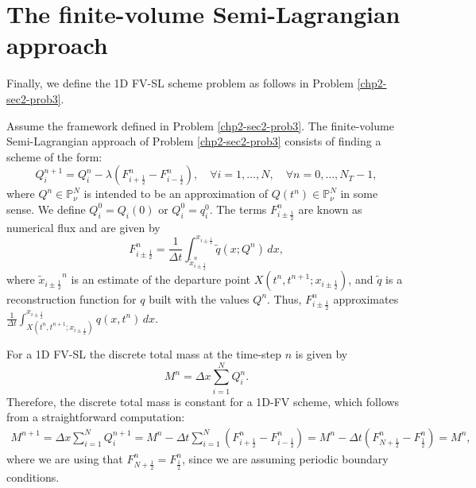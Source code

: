 \section{The finite-volume Semi-Lagrangian approach}
\label{chp2-sec2-fvsl}
Finally, we define the 1D FV-SL scheme problem as follows in Problem \ref{chp2-sec2-prob3}.
\begin{prob}[1D FV-SL scheme]
	\label{chp2-sec2-prob4}
	Assume the framework defined in Problem \ref{chp2-sec2-prob3}.
	The finite-volume Semi-Lagrangian approach of Problem \ref{chp2-sec2-prob3}
	consists of finding a scheme of the form:
	\begin{equation}
		\label{1d-fv-scheme}
		{Q}_{i}^{n+1} = {Q}_{i}^{n} -
		\lambda({F}_{i+\frac{1}{2}}^{n} - {F}_{i-\frac{1}{2}}^{n}),
		\quad \forall i = 1, \ldots, N,
		\quad \forall n = 0, \ldots, N_T-1,
	\end{equation}
	where ${Q}^{n} \in \mathbb{P}^{N}_{\nu}$ is intended to be an approximation
	of ${Q}(t^{n})\in \mathbb{P}^{N}_{\nu}$ in some sense. We define
	${Q}_{i}^{0} = {Q}_i(0)$ or ${Q}_{i}^{0} = {q}^{0}_{i}$.
	The terms ${F}_{i\pm\frac{1}{2}}^{n}$ are known as numerical flux and are given by
	\begin{equation}
		{F}_{i\pm\frac{1}{2}}^{n} =
		\frac{1}{\Delta t}
		\int_{\tilde{x}_{i\pm\frac{1}{2}}^n}^{x_{i\pm\frac{1}{2}}}\tilde{q}(x; Q^n) \,dx,
	\end{equation}
	where ${\tilde{x}_{i\pm\frac{1}{2}}}^n$ is an estimate of the departure point $X(t^n,t^{n+1};x_{i\pm \frac{1}{2}})$,
	and $\tilde{q}$ is a reconstruction function for $q$ built with the values $Q^n$.
	Thus, ${F}_{i\pm\frac{1}{2}}^{n}$ approximates
	$\frac{1}{\Delta t} \int_{X(t^n,t^{n+1};x_{i\pm \frac{1}{2}})}^{x_{i\pm \frac{1}{2}}}{q}(x, t^n) \,dx$.
\end{prob}
For a 1D FV-SL the discrete total mass at the time-step $n$ is given by
\begin{equation}
	\label{1d-fv-mass}
	M^n =  \Delta x \sum_{i=1}^N Q_i^n.
\end{equation}
Therefore, the discrete total mass is constant for a 1D-FV scheme,
which follows from a straightforward computation:
\begin{align*}
	M^{n+1} =  \Delta x \sum_{i=1}^N Q_i^{n+1}
					= M^{n} - \Delta t  \sum_{i=1}^N (F^n_{i+\frac{1}{2}}- F^n_{i-\frac{1}{2}})
					= M^{n} - \Delta t (F^n_{N+\frac{1}{2}}- F^n_{\frac{1}{2}})
					= M^{n},
\end{align*}
where we are using that $F^n_{N+\frac{1}{2}} = F^n_{\frac{1}{2}}$, since we are assuming periodic boundary
conditions.


